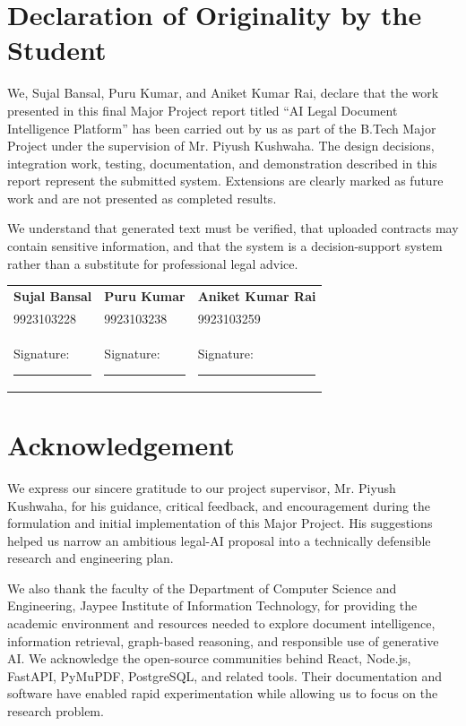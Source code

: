 \documentclass[12pt,a4paper,oneside]{report}
\newcommand{\projecttitle}{AI Legal Document Intelligence Platform}
\newcommand{\supervisor}{Mr. Piyush Kushwaha}
\begin{document}
\clearpage
\chapter*{Declaration of Originality by the Student}
We, Sujal Bansal, Puru Kumar, and Aniket Kumar Rai, declare that the work presented in this final Major Project report titled ``\projecttitle'' has been carried out by us as part of the B.Tech Major Project under the supervision of \supervisor. The design decisions, integration work, testing, documentation, and demonstration described in this report represent the submitted system. Extensions are clearly marked as future work and are not presented as completed results.


We understand that generated text must be verified, that uploaded contracts may contain sensitive information, and that the system is a decision-support system rather than a substitute for professional legal advice.

\par\vfill
\begin{tabularx}{\textwidth}{XXX}
\textbf{Sujal Bansal} & \textbf{Puru Kumar} & \textbf{Aniket Kumar Rai}\\
9923103228 & 9923103238 & 9923103259\\
Signature: \rule{2.5cm}{0.3pt} & Signature: \rule{2.5cm}{0.3pt} & Signature: \rule{2.5cm}{0.3pt}
\end{tabularx}

\chapter*{Acknowledgement}
We express our sincere gratitude to our project supervisor, \supervisor, for his guidance, critical feedback, and encouragement during the formulation and initial implementation of this Major Project. His suggestions helped us narrow an ambitious legal-AI proposal into a technically defensible research and engineering plan.

We also thank the faculty of the Department of Computer Science and Engineering, Jaypee Institute of Information Technology, for providing the academic environment and resources needed to explore document intelligence, information retrieval, graph-based reasoning, and responsible use of generative AI. We acknowledge the open-source communities behind React, Node.js, FastAPI, PyMuPDF, PostgreSQL, and related tools. Their documentation and software have enabled rapid experimentation while allowing us to focus on the research problem.
\end{document}
